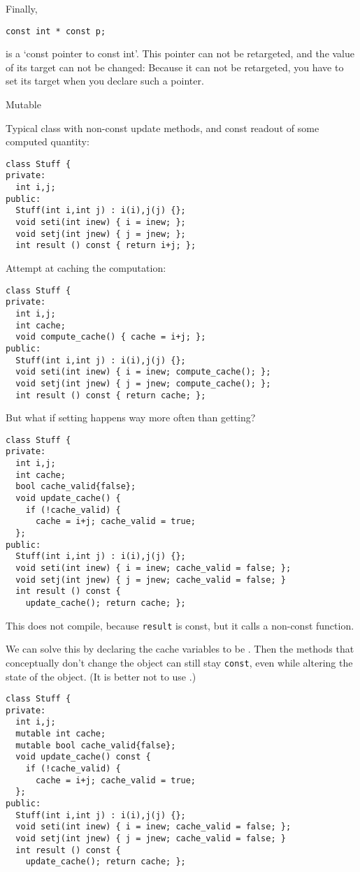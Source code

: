 Finally,
\begin{lstlisting}
const int * const p;
\end{lstlisting}
is a `const pointer to const int'.
This pointer can not be retargeted, and the value
of its target can not be changed:
Because it can not be retargeted,
you have to set its target when you declare such a pointer.

 {Mutable}

Typical class with non-const update methods,
and const readout of some computed quantity:
\begin{lstlisting}
class Stuff {
private:
  int i,j;
public:
  Stuff(int i,int j) : i(i),j(j) {};
  void seti(int inew) { i = inew; };
  void setj(int jnew) { j = jnew; };
  int result () const { return i+j; };
\end{lstlisting}
Attempt at caching the computation:
\begin{lstlisting}
class Stuff {
private:
  int i,j;
  int cache;
  void compute_cache() { cache = i+j; };
public:
  Stuff(int i,int j) : i(i),j(j) {};
  void seti(int inew) { i = inew; compute_cache(); };
  void setj(int jnew) { j = jnew; compute_cache(); };
  int result () const { return cache; };
\end{lstlisting}
But what if setting happens way more often than getting?
\begin{lstlisting}
class Stuff {
private:
  int i,j;
  int cache;
  bool cache_valid{false};
  void update_cache() {
    if (!cache_valid) {
      cache = i+j; cache_valid = true;
  };
public:
  Stuff(int i,int j) : i(i),j(j) {};
  void seti(int inew) { i = inew; cache_valid = false; };
  void setj(int jnew) { j = jnew; cache_valid = false; }
  int result () const {
    update_cache(); return cache; };
\end{lstlisting}
This does not compile, because \lstinline{result} is const, but it
calls a non-const function.

We can solve this by
declaring the cache variables to be .
Then the methods that conceptually don't change the object
can still stay \lstinline{const}, even while altering the state of the
object.
%
(It is better not to use .)

\begin{lstlisting}
class Stuff {
private:
  int i,j;
  mutable int cache;
  mutable bool cache_valid{false};
  void update_cache() const {
    if (!cache_valid) {
      cache = i+j; cache_valid = true;
  };
public:
  Stuff(int i,int j) : i(i),j(j) {};
  void seti(int inew) { i = inew; cache_valid = false; };
  void setj(int jnew) { j = jnew; cache_valid = false; }
  int result () const {
    update_cache(); return cache; };
\end{lstlisting}


